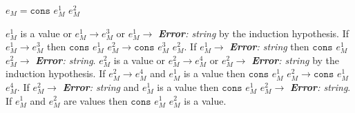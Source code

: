 \begin{case}

$e_{M}=\mathtt{cons}$ $e_{M}^{1}$ $e_{M}^{2}$

$e_{M}^{1}$ is a value or $e_{M}^{1}\rightarrow e_{M}^{3}$ or $e_{M}^{1}\rightarrow$ \emph{\textbf{Error}: string} by the induction hypothesis.  If $e_{M}^{1}\rightarrow e_{M}^{3}$ then $\mathtt{cons}$ $e_{M}^{1}$ $e_{M}^{2}\rightarrow\mathtt{cons}$ $e_{M}^{3}$ $e_{M}^{2}$.  If $e_{M}^{1}\rightarrow$ \emph{\textbf{Error}: string} then $\mathtt{cons}$ $e_{M}^{1}$ $e_{M}^{2}\rightarrow$ \emph{\textbf{Error}: string}.  $e_{M}^{2}$ is a value or $e_{M}^{2}\rightarrow e_{M}^{4}$ or $e_{M}^{2}\rightarrow$ \emph{\textbf{Error}: string} by the induction hypothesis.  If $e_{M}^{2}\rightarrow e_{M}^{4}$ and $e_{M}^{1}$ is a value then $\mathtt{cons}$ $e_{M}^{1}$ $e_{M}^{2}\rightarrow\mathtt{cons}$ $e_{M}^{1}$ $e_{M}^{4}$.  If $e_{M}^{2}\rightarrow$ \emph{\textbf{Error}: string} and $e_{M}^{1}$ is a value then $\mathtt{cons}$ $e_{M}^{1}$ $e_{M}^{2}\rightarrow$ \emph{\textbf{Error}: string}.  If $e_{M}^{1}$ and $e_{M}^{2}$ are values then $\mathtt{cons}$ $e_{M}^{1}$ $e_{M}^{2}$ is a value.

\end{case}